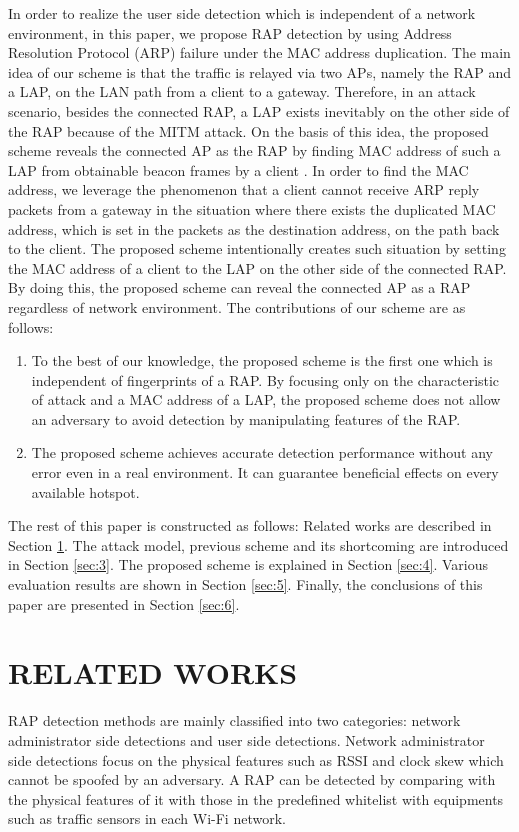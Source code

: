 \documentclass[conference]{IEEEtran}
\begin{document}
In order to realize the user side detection which is independent of a network environment, in this paper, we propose RAP detection by using Address Resolution Protocol (ARP) failure under the MAC address duplication.
The main idea of our scheme is that the traffic is relayed via two APs, namely the RAP and a LAP, on the LAN path from a client to a gateway.
Therefore, in an attack scenario, besides the connected RAP, a LAP exists inevitably on the other side of the RAP because of the MITM attack.
On the basis of this idea, the proposed scheme reveals the connected AP as the RAP by finding MAC address of such a LAP from obtainable beacon frames by a client \cite{beacon}.
In order to find the MAC address, we leverage the phenomenon that a client cannot receive ARP reply packets from a gateway in the situation where there exists the duplicated MAC address, which is set in the packets as the destination address, on the path back to the client.
The proposed scheme intentionally creates such situation by setting the MAC address of a client to the LAP on the other side of the connected RAP.
By doing this, the proposed scheme can reveal the connected AP as a RAP regardless of network environment.
The contributions of our scheme are as follows:
\begin{enumerate}
    \renewcommand{\labelenumi}{\arabic{enumi}).}
    \item To the best of our knowledge, the proposed scheme is the first one which is independent of fingerprints of a RAP. By focusing only on the characteristic of attack and a MAC address of a LAP, the proposed scheme does not allow an adversary to avoid detection by manipulating features of the RAP.
    \item The proposed scheme achieves accurate detection performance without any error even in a real environment. It can guarantee beneficial effects on every available hotspot.
\end{enumerate}
The rest of this paper is constructed as follows: Related works are described in Section \ref{sec:2}.
The attack model, previous scheme and its shortcoming are introduced in Section \ref{sec:3}.
The proposed scheme is explained in Section \ref{sec:4}.
Various evaluation results are shown in Section \ref{sec:5}.
Finally, the conclusions of this paper are presented in Section \ref{sec:6}.

\section{RELATED WORKS}\label{sec:2}
RAP detection methods are mainly classified into two categories: network administrator side detections and user side detections.
Network administrator side detections \cite{prapd}\cite{clockskew} focus on the physical features such as RSSI and clock skew which cannot be spoofed by an adversary.
A RAP can be detected by comparing with the physical features of it with those in the predefined whitelist with equipments such as traffic sensors in each Wi-Fi network.
\end{document}
